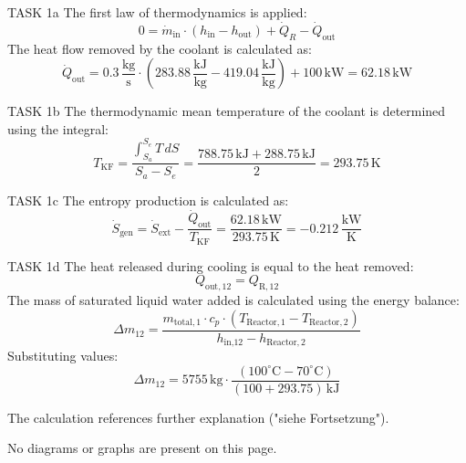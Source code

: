 TASK 1a  
The first law of thermodynamics is applied:  
\[
0 = \dot{m}_{\text{in}} \cdot (h_{\text{in}} - h_{\text{out}}) + \dot{Q}_R - \dot{Q}_{\text{out}}
\]  
The heat flow removed by the coolant is calculated as:  
\[
\dot{Q}_{\text{out}} = 0.3 \, \frac{\text{kg}}{\text{s}} \cdot \left( 283.88 \, \frac{\text{kJ}}{\text{kg}} - 419.04 \, \frac{\text{kJ}}{\text{kg}} \right) + 100 \, \text{kW} = 62.18 \, \text{kW}
\]  

TASK 1b  
The thermodynamic mean temperature of the coolant is determined using the integral:  
\[
T_{\text{KF}} = \frac{\int_{S_a}^{S_e} T \, dS}{S_a - S_e} = \frac{788.75 \, \text{kJ} + 288.75 \, \text{kJ}}{2} = 293.75 \, \text{K}
\]  

TASK 1c  
The entropy production is calculated as:  
\[
\dot{S}_{\text{gen}} = \dot{S}_{\text{ext}} - \frac{\dot{Q}_{\text{out}}}{T_{\text{KF}}} = \frac{62.18 \, \text{kW}}{293.75 \, \text{K}} = -0.212 \, \frac{\text{kW}}{\text{K}}
\]  

TASK 1d  
The heat released during cooling is equal to the heat removed:  
\[
Q_{\text{out},12} = Q_{\text{R},12}
\]  
The mass of saturated liquid water added is calculated using the energy balance:  
\[
\Delta m_{12} = \frac{m_{\text{total},1} \cdot c_p \cdot (T_{\text{Reactor},1} - T_{\text{Reactor},2})}{h_{\text{in,12}} - h_{\text{Reactor},2}}
\]  
Substituting values:  
\[
\Delta m_{12} = 5755 \, \text{kg} \cdot \frac{(100^\circ\text{C} - 70^\circ\text{C})}{(100 + 293.75) \, \text{kJ}}
\]  

The calculation references further explanation ("siehe Fortsetzung").  

No diagrams or graphs are present on this page.